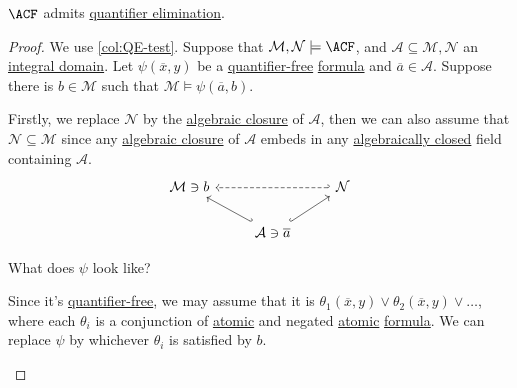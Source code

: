 \begin{theorem}
	\(\ACF\) admits \hyperref[def:quantifier-elimination]{quantifier elimination}.
\end{theorem}
\begin{proof}
	We use \autoref{col:QE-test}. Suppose that \(\mathcal{M} , \mathcal{N} \models \ACF\), and \(\mathcal{A} \subseteq \mathcal{M} , \mathcal{N} \) an \hyperref[def:integral-domain]{integral domain}. Let \(\psi (\overline{x} , y)\) be a \hyperref[not:quantifier-free]{quantifier-free} \hyperref[def:formula]{formula} and \(\overline{a} \in \mathcal{A} \). Suppose there is \(b\in \mathcal{M} \) such that \(\mathcal{M} \models \psi (\overline{a} , b)\).

	Firstly, we replace \(\mathcal{N} \) by the \hyperref[def:algebraic-closure]{algebraic closure} of \(\mathcal{A} \), then we can also assume that \(\mathcal{N} \subseteq \mathcal{M} \) since any \hyperref[def:algebraic-closure]{algebraic closure} of \(\mathcal{A} \) embeds in any \hyperref[def:algebraically-closed]{algebraically closed} field containing \(\mathcal{A} \).
	\[\begin{tikzcd}
			{\mathcal{M} \ni b} && {\mathcal{N}} \\
			& {\mathcal{A}\ni \overline{a}}
			\arrow[hook, from=2-2, to=1-3]
			\arrow[hook', from=2-2, to=1-1]
			\arrow[dashed, hook', from=1-3, to=1-1]
		\end{tikzcd}\]

	\begin{problem*}
		What does \(\psi \) look like?
	\end{problem*}
	\begin{answer}
		Since it's \hyperref[not:quantifier-free]{quantifier-free}, we may assume that it is \(\theta _1(\overline{x} , y) \lor \theta _2(\overline{x} , y) \lor \dots \), where each \(\theta _i\) is a conjunction of \hyperref[not:atomic]{atomic} and negated \hyperref[not:atomic]{atomic} \hyperref[def:formula]{formula}. We can replace \(\psi \) by whichever \(\theta _i\) is satisfied by \(b\).
	\end{answer}


\end{proof}
